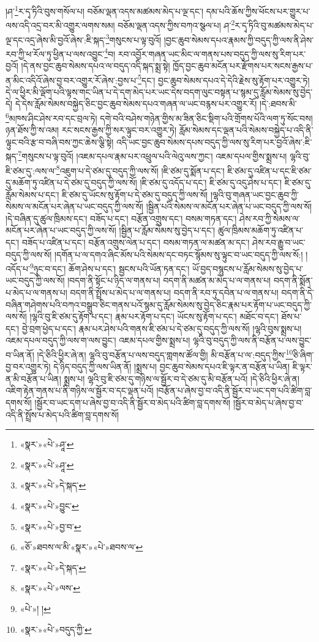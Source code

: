 །ཤ་\footnote{«སྣར་»«པེ་»ཤཱ་}ར་དྭ་ཏིའི་བུས་གསོལ་པ། བཅོམ་ལྡན་འདས་མཚམས་མེད་པ་ལྔ་དང་། དམ་པའི་ཆོས་ཀྱིས་ཕོངས་པར་གྱུར་པ་ལས་འདི་འདྲ་བར་མི་འགྱུར་ལགས་སམ། བཅོམ་ལྡན་འདས་ཀྱིས་བཀའ་སྩལ་པ། ཤ་\footnote{«སྣར་»«པེ་»ཤཱ་}ར་དྭ་ཏིའི་བུ་མཚམས་མེད་པ་ལྔ་དང་འདྲ་ཞེས་མི་བྱའོ་ཞེས་:ཇི་སྐད་\footnote{«སྣར་»«པེ་»དེ་སྐད་}གསུངས་པ་ལྟ་བུའོ། །བྱང་ཆུབ་སེམས་དཔའ་རྣམས་ཀྱི་བདུད་ཀྱི་ལས་ནི་ཤེས་རབ་ཀྱི་ཕ་རོལ་ཏུ་ཕྱིན་པ་ལས་འབྱུང་\footnote{«སྣར་»«པེ་»བྱུང་}བ། རབ་འབྱོར་གཞན་ཡང་མིང་ལ་གནས་པས་བདུད་ཀྱི་ལས་སུ་རིག་པར་བྱའོ། །དེ་ནས་བྱང་ཆུབ་སེམས་དཔའ་ལ་བདུད་འདི་སྐད་སྨྲ་སྟེ། ཁྱོད་བྱང་ཆུབ་མངོན་པར་རྫོགས་པར་སངས་རྒྱས་པ་ན་མིང་འདིའོ་ཞེས་བྱ་བར་འགྱུར་རོ་ཞེས་:བྱས་པ་\footnote{«སྣར་»«པེ་»བྱ་བ་}དང་། བྱང་ཆུབ་སེམས་དཔའ་དེ་དེའི་རྗེས་སུ་རྟོག་པར་འགྱུར་ཏེ། དེ་ལ་ཕྱིར་མི་ལྡོག་པའི་ལྟས་གང་ཡིན་པ་དེ་དག་མེད་པར་ཡང་དེས་བདག་ལུང་བསྟན་པ་སྙམ་དུ་རློམ་སེམས་སུ་བྱེད་དེ། དེ་དེས་རློམ་སེམས་བསྐྱེད་ཅིང་བྱང་ཆུབ་སེམས་དཔའ་གཞན་ལ་ཡང་བརྙས་པར་འགྱུར་རོ། །དེ་:ཐབས་མི་\footnote{«ཅོ་»ཐབས་ལ་མི་«སྣར་»«པེ་»ཐབས་ལ་}མཁས་ཤིང་ཤེས་རབ་དང་བྲལ་ཏེ། དགེ་བའི་བཤེས་གཉེན་གྱིས་མ་ཟིན་ཅིང་སྡིག་པའི་གྲོགས་པོའི་ལག་ཏུ་སོང་བས། ཉན་ཐོས་ཀྱི་ས་འམ། རང་སངས་རྒྱས་ཀྱི་སར་ལྟུང་བར་འགྱུར་ཏེ། རློམ་སེམས་དང་ལྡན་པའི་སེམས་བསྐྱེད་པ་འདི་ནི་ལྟུང་བའི་རྩ་བ་བཞི་བས་ཀྱང་ཆེས་ལྕི་སྟེ། འདི་ཡང་བྱང་ཆུབ་སེམས་དཔས་བདུད་ཀྱི་ལས་སུ་རིག་པར་བྱའོ་ཞེས་:ཇི་སྐད་\footnote{«སྣར་»«པེ་»དེ་སྐད་}གསུངས་པ་ལྟ་བུའོ། །འཇམ་དཔལ་རྣམ་པར་འཕྲུལ་པའི་ལེའུ་ལས་ཀྱང་། འཇམ་དཔལ་གྱིས་སྨྲས་པ། ལྷའི་བུ་ཇི་ཙམ་དུ་:ལས་ལ་\footnote{«སྣར་»«པེ་»ལས་}འཇུག་པ་དེ་ཙམ་དུ་བདུད་ཀྱི་ལས་སོ། །ཇི་ཙམ་དུ་སྨོན་པ་དང་། ཇི་ཙམ་དུ་འཛིན་པ་དང་ཇི་ཙམ་དུ་མཆོག་ཏུ་འཛིན་པ་དེ་ཙམ་དུ་བདུད་ཀྱི་ལས་སོ། །ཇི་ཙམ་དུ་འདོད་པ་དང་། ཇི་ཙམ་དུ་འདུ་ཤེས་པ་དང་། ཇི་ཙམ་དུ་རློམ་སེམས་པ་དང་། ཇི་ཙམ་དུ་ཡོངས་སུ་རྟོག་པ་དེ་ཙམ་དུ་བདུད་ཀྱི་ལས་སོ། །ལྷའི་བུ་གཞན་ཡང་བྱང་ཆུབ་ཀྱི་སེམས་ལ་མངོན་པར་ཞེན་པ་ཡང་བདུད་ཀྱི་ལས་སོ། །སྦྱིན་པའི་སེམས་ལ་མངོན་པར་ཞེན་པ་ཡང་བདུད་ཀྱི་ལས་སོ། །དེ་བཞིན་དུ་ཚུལ་ཁྲིམས་དང་། བཟོད་པ་དང་། བརྩོན་འགྲུས་དང་། བསམ་གཏན་དང་། ཤེས་རབ་ཀྱི་སེམས་ལ་མངོན་པར་ཞེན་པ་ཡང་བདུད་ཀྱི་ལས་སོ། །སྦྱིན་པ་རློམ་སེམས་སུ་བྱེད་པ་དང་། ཚུལ་ཁྲིམས་མཆོག་ཏུ་འཛིན་པ་དང་། བཟོད་པ་འཛིན་པ་དང་། བརྩོན་འགྲུས་ལེན་པ་དང་། བསམ་གཏན་ལ་མཚན་མ་དང་། ཤེས་རབ་རྒྱུ་བ་ཡང་བདུད་ཀྱི་ལས་སོ། །དགོན་པ་ལ་དགའ་ཞིང་མོས་པའི་སེམས་དང་བཏང་སྙོམས་སུ་ལྟུང་བ་ཡང་བདུད་ཀྱི་ལས་སོ:། །འདོད་པ་\footnote{«པེ་»། །}ཉུང་བ་དང་། ཆོག་ཤེས་པ་དང་། སྦྱངས་པའི་ཡོན་ཏན་དང་། ཡོ་བྱད་བསྙུངས་པ་རློམ་སེམས་སུ་བྱེད་པ་ཡང་བདུད་ཀྱི་ལས་སོ། །བདག་ནི་སྟོང་པ་ཉིད་ལ་གནས་པ། བདག་ནི་མཚན་མ་མེད་པ་ལ་གནས་པ། བདག་ནི་སྨོན་པ་མེད་པ་ལ་གནས་པ། བདག་ནི་སྤྲོས་པ་མེད་པ་ལ་གནས་པ། བདག་ནི་རབ་ཏུ་དབེན་པ་ལ་གནས་པ། བདག་ནི་དེ་བཞིན་གཤེགས་པའི་བཀའ་བསྒྲུབ་ཅིང་གནས་པའོ་སྙམ་དུ་རློམ་སེམས་སུ་བྱེད་ཅིང་རྣམ་པར་རྟོག་པ་ཡང་བདུད་ཀྱི་ལས་སོ། །ལྷའི་བུ་ཇི་ཙམ་དུ་རྟོག་པ་དང་། རྣམ་པར་རྟོག་པ་དང་། ཡོངས་སུ་རྟོག་པ་དང་། མཐོང་བ་དང་། ཐོས་པ་དང་། བྱེ་བྲག་ཕྱེད་པ་དང་། རྣམ་པར་ཤེས་པའི་གནས་ཇི་ཙམ་པ་དེ་ཙམ་དུ་བདུད་ཀྱི་ལས་སོ། །ལྷའི་བུས་སྨྲས་པ། འཇམ་དཔལ་བདུད་ཀྱི་ལས་ག་ལས་བྱུང་། འཇམ་དཔལ་གྱིས་སྨྲས་པ། ལྷའི་བུ་བདུད་ཀྱི་ལས་ནི་བརྩོན་པ་ལས་བྱུང་བ་ཡིན་ནོ། །དེ་ཅིའི་ཕྱིར་ཞེ་ན། ལྷའི་བུ་བརྩོན་པ་ལས་བདུད་གླགས་ཚོལ་གྱི། མི་བརྩོན་པ་ལ་:བདུད་ཀྱིས་\footnote{«སྣར་»«པེ་»བདུད་ཀྱི་}ཅི་ཞིག་བྱ་བར་འགྱུར་ཏེ། དེ་ཉིད་བདུད་ཀྱི་ལས་ཡིན་ནོ། །སྨྲས་པ། བྱང་ཆུབ་སེམས་དཔའ་ཇི་ལྟར་ན་བརྩོན་པ་ཡིན། ཇི་ལྟར་ན་མི་བརྩོན་པ་ཡིན། སྨྲས་པ། ལྷའི་བུ་ཇི་ཙམ་དུ་གཉིས་ལ་སྦྱོར་བ་དེ་ཙམ་དུ་མི་བརྩོན་པའོ། །དེ་ཅིའི་ཕྱིར་ཞེ་ན། འཇིག་རྟེན་གནས་པ་ནི་གཉིས་ལ་སྦྱོར་བ་དང་ལྡན་པའོ། །བརྩོན་པ་ཞེས་བྱ་བ་འདི་ནི་སྦྱོར་བ་ཡང་དག་པའི་ཚིག་བླ་དགས་སོ། །སྦྱོར་བ་ཡང་དག་པ་ཞེས་བྱ་བ་འདི་ནི་སྦྱོར་བ་མེད་པའི་ཚིག་བླ་དགས་སོ། །སྦྱོར་བ་མེད་པ་ཞེས་བྱ་བ་འདི་ནི་སྤྲོས་པ་མེད་པའི་ཚིག་བླ་དགས་སོ། 